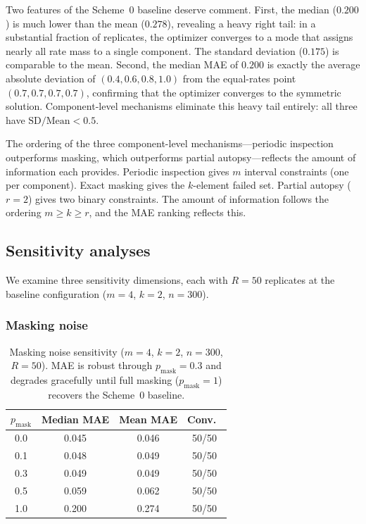 \documentclass[12pt]{article}
\begin{document}
Two features of the Scheme~0 baseline deserve comment.  First, the
median ($0.200$) is much lower than the mean ($0.278$), revealing a heavy
right tail: in a substantial fraction of replicates, the optimizer
converges to a mode that assigns nearly all rate mass to a single
component.  The standard deviation ($0.175$) is comparable to the mean.
Second, the median MAE of $0.200$ is exactly the average absolute
deviation of $(0.4, 0.6, 0.8, 1.0)$ from the equal-rates point
$(0.7, 0.7, 0.7, 0.7)$, confirming that the optimizer converges to the
symmetric solution.  Component-level mechanisms eliminate this heavy tail
entirely: all three have $\text{SD}/\text{Mean} < 0.5$.

The ordering of the three component-level mechanisms---periodic inspection
outperforms masking, which outperforms partial autopsy---reflects the
amount of information each provides.  Periodic inspection gives $m$
interval constraints (one per component).  Exact masking gives the
$k$-element failed set.  Partial autopsy ($r = 2$) gives two binary
constraints.  The amount of information follows the ordering
$m \geq k \geq r$, and the MAE ranking reflects this.

\subsection{Sensitivity analyses}\label{sec:sensitivity}

We examine three sensitivity dimensions, each with $R = 50$ replicates at
the baseline configuration ($m = 4$, $k = 2$, $n = 300$).

\subsubsection{Masking noise}\label{sec:masking-noise}

\begin{table}[t]
\centering
\caption{Masking noise sensitivity ($m = 4$, $k = 2$, $n = 300$,
  $R = 50$).  MAE is robust through $p_{\text{mask}} = 0.3$ and
  degrades gracefully until full masking ($p_{\text{mask}} = 1$)
  recovers the Scheme~0 baseline.}\label{tab:masking-noise}
\begin{tabular}{@{}cccc@{}}
\toprule
$p_\text{mask}$ & Median MAE & Mean MAE & Conv.\ \\
\midrule
0.0 & 0.045 & 0.046 & 50/50 \\
0.1 & 0.048 & 0.049 & 50/50 \\
0.3 & 0.049 & 0.049 & 50/50 \\
0.5 & 0.059 & 0.062 & 50/50 \\
1.0 & 0.200 & 0.274 & 50/50 \\
\bottomrule
\end{tabular}
\end{table}
\end{document}
